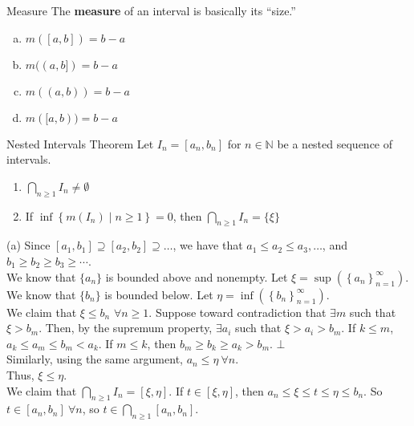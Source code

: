 \documentclass[8pt]{extarticle}
\newcommand{\N}{\mathbb{N}}
\begin{document}
  \begin{problem}{Measure}
    The \textbf{measure} of an interval is basically its ``size.''
    \begin{enumerate}[(a)]
      \item $m([a,b]) = b-a$
      \item $m((a,b]) = b-a$
      \item $m((a,b)) = b-a$
      \item $m([a,b)) = b-a$
    \end{enumerate}
  \end{problem}
  \begin{problem}{Nested Intervals Theorem}
    Let $I_n = [a_n,b_n]$ for $n\in\N$ be a nested sequence of intervals.
    \begin{enumerate}[(1)]
      \item $\bigcap_{n \geq 1}I_n \neq \emptyset$
      \item If $\inf\left\{m(I_n)\mid n\geq 1\right\} = 0$, then $\bigcap_{n\geq 1} I_n = \{\xi\}$
    \end{enumerate}
    \tcblower
    \begin{problem}{(a)}
      Since $[a_1,b_1] \supseteq [a_2,b_2] \supseteq \dots$, we have that $a_1\leq a_2\leq a_3,\dots$, and $b_1 \geq b_2 \geq b_3 \geq \cdots$.\\

      We know that $\{a_n\}$ is bounded above and nonempty. Let $\xi = \sup\left(\left\{a_n\right\}_{n=1}^{\infty}\right)$.\\

      We know that $\{b_n\}$ is bounded below. Let $\eta = \inf\left(\left\{b_n\right\}_{n=1}^{\infty}\right)$.\\

      We claim that $\xi \leq b_n$ $\forall n \geq 1$. Suppose toward contradiction that $\exists m$ such that $\xi > b_m$. Then, by the supremum property, $\exists a_i$ such that $\xi > a_i > b_m$. If $k\leq m$, $a_k \leq a_m \leq b_m < a_k$. If $m \leq k$, then $b_m \geq b_k \geq a_k > b_m$. $\bot$\\

      Similarly, using the same argument, $a_n \leq \eta~\forall n$.\\

      Thus, $\xi \leq \eta$.\\

      We claim that $\bigcap_{n\geq 1} I_n = [\xi,\eta]$. If $t\in [\xi,\eta]$, then $a_n \leq \xi \leq t \leq \eta \leq b_n$. So $t\in [a_n,b_n]~\forall n$, so $t\in \bigcap_{n\geq 1} [a_n,b_n]$.\\


\end{problem}
\end{problem}
\end{document}
